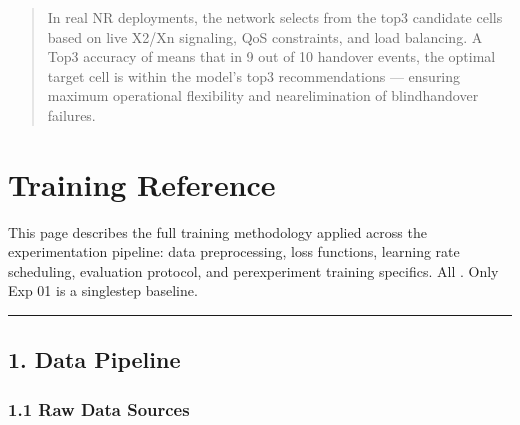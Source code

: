 \documentclass[letterpaper,10pt,english]{sphinxmanual}
\begin{document}
\begin{quote}

\sphinxAtStartPar
{} In real NR deployments, the network selects from the top\sphinxhyphen{}3 candidate cells based on live X2/Xn signaling, QoS constraints, and load balancing. A Top\sphinxhyphen{}3 accuracy of  means that in 9 out of 10 handover events, the optimal target cell is within the model’s top\sphinxhyphen{}3 recommendations — ensuring maximum operational flexibility and near\sphinxhyphen{}elimination of blind\sphinxhyphen{}handover failures.
\end{quote}

\sphinxstepscope


\chapter{Training Reference}
\label{\detokenize{training:training-reference}}\label{\detokenize{training::doc}}
\sphinxAtStartPar
This page describes the full training methodology applied across the experimentation pipeline: data preprocessing, loss functions, learning rate scheduling, evaluation protocol, and per\sphinxhyphen{}experiment training specifics. All . Only Exp 01 is a single\sphinxhyphen{}step baseline.


\bigskip\hrule\bigskip



\section{1. Data Pipeline}
\label{\detokenize{training:data-pipeline}}

\subsection{1.1 Raw Data Sources}
\label{\detokenize{training:raw-data-sources}}
\end{document}
